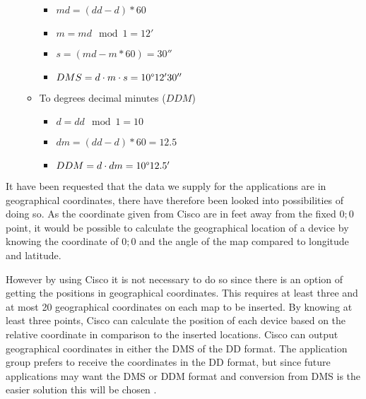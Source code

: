 \begin{itemize}
\begin{itemize}
\begin{itemize}
			\item $ md = (dd - d)*60 $
			\item $ m = md \mod 1 = 12' $
			\item $ s = (md - m * 60) = 30''$
			\item $ DMS = d \cdot m \cdot s = 10\degree 12' 30''$ 
		\end{itemize}
		\item To degrees decimal minutes ($DDM$)
		\begin{itemize}
			\item $ d = dd \mod 1 = 10 $
			\item $ dm = (dd - d) * 60 = 12.5 $
			\item $ DDM = d \cdot dm = 10\degree 12.5'$
		\end{itemize}
	\end{itemize}
\end{itemize}

It have been requested that the data we supply for the applications are in geographical coordinates, there have therefore been looked into possibilities of doing so.
As the coordinate given from Cisco are in feet away from the fixed ${0;0}$ point, it would be possible to calculate the geographical location of a device by knowing the coordinate of ${0;0}$ and the angle of the map compared to longitude and latitude. 

However by using Cisco it is not necessary to do so since there is an option of getting the positions in geographical coordinates. This requires at least three and at most 20 geographical coordinates on each map to be inserted. By knowing at least three points, Cisco can calculate the position of each device based on the relative coordinate in comparison to the inserted locations\cite{geo_cisco}. 
Cisco can output geographical coordinates in either the DMS of the DD format\cite{cisco_geo_type}. The application group prefers to receive the coordinates in the DD format, but since future applications may want the DMS or DDM format and conversion from DMS is the easier solution this will be chosen .

